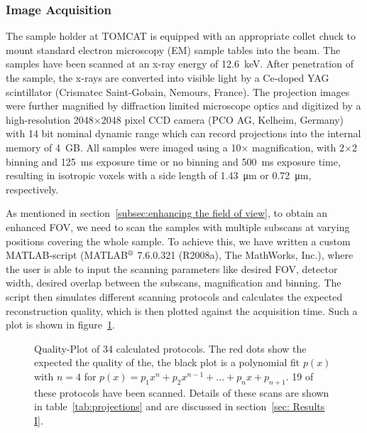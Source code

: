 \subsubsection{Image Acquisition}
\label{seq:Image Acquisition}
The sample holder at TOMCAT is equipped with an appropriate collet chuck to mount standard electron microscopy (EM) sample tables into the beam. The samples have been scanned at an x-ray energy of \SI{12.6}{\kilo\electronvolt}. After penetration of the sample, the x-rays are converted into visible light by a Ce-doped YAG scintillator (Crismatec Saint-Gobain, Nemours, France). The projection images were further magnified by diffraction limited microscope optics and digitized by a high-resolution 2048$\times$2048 pixel CCD camera (PCO AG, Kelheim, Germany) with 14 bit nominal dynamic range which can record projections into the internal memory of \SI{4}{\giga B}. All samples were imaged using a 10$\times$ magnification, with 2$\times$2 binning and \SI{125}{\milli\second} exposure time or no binning and \SI{500}{\milli\second} exposure time, resulting in isotropic voxels with a side length of \SI{1.43}{\micro\meter} or \SI{0.72}{\micro\meter}, respectively.

As mentioned in section~\ref{subsec:enhancing the field of view}, to obtain an enhanced FOV, we need to scan the samples with multiple subscans at varying positions covering the whole sample. To achieve this, we have written a custom MATLAB-script (MATLAB$^\text{\textregistered}$ 7.6.0.321 (R2008a), The MathWorks, Inc.), where the user is able to input the scanning parameters like desired FOV, detector width, desired overlap between the subscans, magnification and binning. The script then simulates different scanning protocols and calculates the expected reconstruction quality, which is then plotted against the acquisition time. Such a plot is shown in figure~\ref{fig:2008c-qualityplot}.

\begin{figure}
	\centering
		
	\caption{Quality-Plot of 34 calculated protocols. The red dots show the expected the quality of the, the black plot is a polynomial fit $p(x)$ with $n=4$ for $p(x)=p_{1}x^{n}+p_{2}x^{n-1}+...+p_{n}x+p_{n+1}$. 19 of these protocols have been scanned. Details of these scans are shown in table~\ref{tab:projections} and are discussed in section~\ref{sec: Results I}.}
	\label{fig:2008c-qualityplot}
\end{figure}

